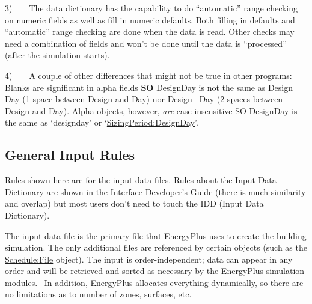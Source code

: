 3)~~~~The data dictionary has the capability to do ``automatic'' range checking on numeric fields as well as fill in numeric defaults. Both filling in defaults and ``automatic'' range checking are done when the data is read. Other checks may need a combination of fields and won't be done until the data is ``processed'' (after the simulation starts).

4)~~~~A couple of other differences that might not be true in other programs:~ Blanks are significant in alpha fields \textbf{SO} DesignDay is not the same as Design Day (1 space between Design and Day) nor Design~ Day (2 spaces between Design and Day). Alpha objects, however, \emph{are} case insensitive SO DesignDay is the same as `designday' or `\hyperref[sizingperioddesignday]{SizingPeriod:DesignDay}'.

\subsection{General Input Rules}\label{general-input-rules}

Rules shown here are for the input data files. Rules about the Input Data Dictionary are shown in the Interface Developer's Guide (there is much similarity and overlap) but most users don't need to touch the IDD (Input Data Dictionary).

The input data file is the primary file that EnergyPlus uses to create the building simulation. The only additional files are referenced by certain objects (such as the \hyperref[schedulefile]{Schedule:File} object). The input is order-independent; data can appear in any order and will be retrieved and sorted as necessary by the EnergyPlus simulation modules.~ In addition, EnergyPlus allocates everything dynamically, so there are no limitations as to number of zones, surfaces, etc.

